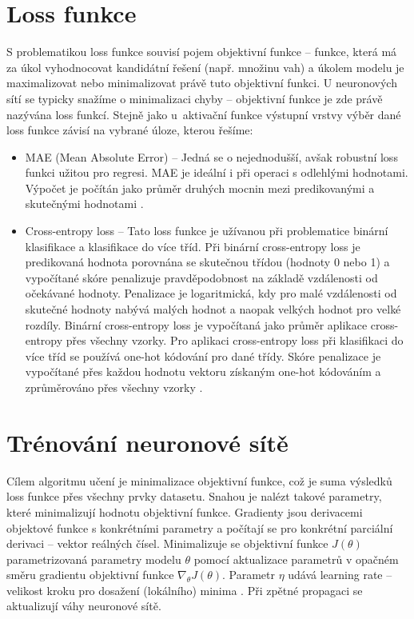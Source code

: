 \section{Loss funkce}
S problematikou loss funkce souvisí pojem objektivní funkce -- funkce, která má za úkol vyhodnocovat kandidátní řešení (např. množinu vah) a úkolem modelu je maximalizovat nebo minimalizovat právě tuto objektivní funkci. U neuronových sítí se typicky snažíme o minimalizaci chyby -- objektivní funkce je zde právě nazývána loss funkcí. Stejně jako u~aktivační funkce výstupní vrstvy výběr dané loss funkce závisí na vybrané úloze, kterou řešíme:
\begin{itemize}
    \item MAE (Mean Absolute Error) -- Jedná se o nejednodušší, avšak robustní loss funkci užitou pro regresi. MAE je ideální i při operaci s odlehlými hodnotami. Výpočet je počítán jako průměr druhých mocnin mezi predikovanými a skutečnými hodnotami \cite{LossFunctions}.
    \item Cross-entropy loss -- Tato loss funkce je užívanou při problematice binární klasifikace a klasifikace do více tříd. Při binární cross-entropy loss je predikovaná hodnota porovnána se skutečnou třídou (hodnoty 0 nebo 1) a vypočítané skóre penalizuje pravděpodobnost na základě vzdálenosti od očekávané hodnoty. Penalizace je logaritmická, kdy pro malé vzdálenosti od skutečné hodnoty nabývá malých hodnot a naopak velkých hodnot pro velké rozdíly. Binární cross-entropy loss je vypočítaná jako průměr aplikace cross-entropy přes všechny vzorky. Pro aplikaci cross-entropy loss při klasifikaci do více tříd se používá one-hot kódování pro dané třídy. Skóre penalizace je vypočítané přes každou hodnotu vektoru získaným one-hot kódováním a zprůměrováno přes všechny vzorky \cite{LossFunctions}.
\end{itemize}
\section{Trénování neuronové sítě}
Cílem algoritmu učení je minimalizace objektivní funkce, což je suma výsledků loss funkce přes všechny prvky datasetu. Snahou je nalézt takové parametry, které minimalizují hodnotu objektivní funkce. Gradienty jsou derivacemi objektové funkce s konkrétními parametry a počítají se pro konkrétní parciální derivaci -- vektor reálných čísel. Minimalizuje se objektivní funkce $J(\theta)$ parametrizovaná parametry modelu $\theta$ pomocí aktualizace parametrů v opačném směru gradientu objektivní funkce $\nabla_{\theta}J(\theta)$. Parametr $\eta$ udává learning rate -- velikost kroku pro dosažení (lokálního) minima \cite{GradientDescent}. Při zpětné propagaci se aktualizují váhy neuronové sítě.

